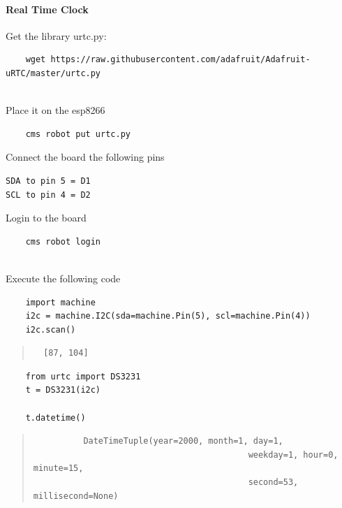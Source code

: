 \paragraph{Real Time Clock}\label{real-time-clock}

Get the library urtc.py:

\begin{verbatim}
    wget https://raw.githubusercontent.com/adafruit/Adafruit-uRTC/master/urtc.py
    
\end{verbatim}

Place it on the esp8266

\begin{verbatim}
    cms robot put urtc.py
\end{verbatim}

Connect the board the following pins

\begin{verbatim}
SDA to pin 5 = D1
SCL to pin 4 = D2
\end{verbatim}

Login to the board

\begin{verbatim}
    cms robot login
    
\end{verbatim}

Execute the following code

\begin{verbatim}
    import machine
    i2c = machine.I2C(sda=machine.Pin(5), scl=machine.Pin(4))
    i2c.scan()
\end{verbatim}

\begin{quote}
\begin{verbatim}
  [87, 104]
\end{verbatim}
\end{quote}

\begin{verbatim}
    from urtc import DS3231
    t = DS3231(i2c)

    t.datetime()
\end{verbatim}

\begin{quote}
\begin{verbatim}
          DateTimeTuple(year=2000, month=1, day=1, 
                                           weekday=1, hour=0, minute=15,
                                           second=53, millisecond=None)
\end{verbatim}
\end{quote}


